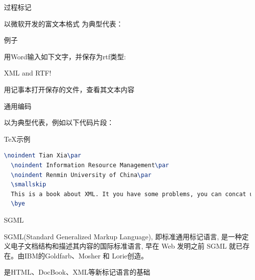 \begin{frame}{过程标记}
\par 以微软开发的富文本格式 为典型代表：
\begin{exampleblock} {例子}
	\par 用Word输入如下文字，并保存为rtf类型:
	\par {\color{red}XML} and RTF!
	\par 用记事本打开保存的文件，查看其文本内容
\end{exampleblock}
\end{frame}

\begin{frame}[fragile]{通用编码}
\par 以为典型代表，例如以下代码片段：
\begin{exampleblock}{TeX示例}
  \begin{lstlisting}[tabsize=8,language=TeX]
  \noindent Tian Xia\par
  \noindent Information Resource Management\par
  \noindent Renmin University of China\par
  \smallskip
  This is a book about XML. It you have some problems, you can concat us directly.\par
  \bye
  \end{lstlisting}
\end{exampleblock}
\end{frame}


\begin{frame}[fragile]{SGML}
\par SGML(Standard Generalized Markup Language), 即标准通用标记语言, 是一种定义电子文档结构和描述其内容的国际标准语言, 早在 Web 发明之前 SGML 就已存在。由IBM的Goldfarb、Mosher 和 Lorie创造。
\par 是HTML、DocBook、XML等新标记语言的基础
\end{frame}


